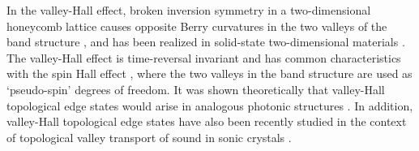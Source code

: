 \documentclass[prl,twocolumn,showpacs,amsmath,amssymb,superscriptaddress]{revtex4-1}
\begin{document}
In the valley-Hall effect, broken inversion symmetry in a two-dimensional honeycomb lattice causes opposite Berry curvatures in the two valleys of the band structure \cite{Xiao2007,Yao2008}, and has been realized in solid-state two-dimensional materials \cite{Mak2014,Gorbachev2014,Sui2015,Shimazaki2015,Ju2015}.
The valley-Hall effect is time-reversal invariant and has common characteristics with the spin Hall effect \cite{Kane95}, where the two valleys in the band structure are used as `pseudo-spin' degrees of freedom. 
It was shown theoretically that valley-Hall topological edge states would arise in analogous photonic structures \cite{Ma2016,Dong2017,Chen2016_01,Chen2016_02,fefferman2016bifurcations,fefferman2016edge,fefferman2017}.
In addition, valley-Hall topological edge states have also been recently studied in the context of topological valley transport of sound in sonic crystals \cite{Lu2017}.
\end{document}
